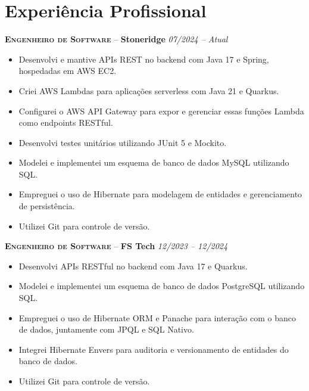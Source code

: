 \documentclass[a4paper,12pt]{article}
\newcommand{\preheadingspacing}{\vspace{6pt}}
\begin{document}
\preheadingspacing

\section{Experiência Profissional}
\vspace{8pt}

\textbf{\textsc{Engenheiro de Software}} -- \textbf{Stoneridge} \hfill \textit{07/2024 -- Atual}

{\small
\begin{itemize}[leftmargin=*,label=\large\textbullet]
    \setlength\itemsep{-0.2em}
    \item Desenvolvi e mantive APIs REST no backend com Java 17 e Spring, hospedadas em AWS EC2.
    \item Criei AWS Lambdas para aplicações serverless com Java 21 e Quarkus.
    \item Configurei o AWS API Gateway para expor e gerenciar essas funções Lambda como endpoints RESTful.
    \item Desenvolvi testes unitários utilizando JUnit 5 e Mockito.
    \item Modelei e implementei um esquema de banco de dados MySQL utilizando SQL.
    \item Empreguei o uso de Hibernate para modelagem de entidades e gerenciamento de persistência.
    \item Utilizei Git para controle de versão.
\end{itemize}
}

\textbf{\textsc{Engenheiro de Software}} -- \textbf{FS Tech} \hfill \textit{12/2023 -- 12/2024}

{\small
\begin{itemize}[leftmargin=*,label=\large\textbullet]
    \setlength\itemsep{-0.2em}
    \item Desenvolvi APIs RESTful no backend com Java 17 e Quarkus.
    \item Modelei e implementei um esquema de banco de dados PostgreSQL utilizando SQL.
    \item Empreguei o uso de Hibernate ORM e Panache para interação com o banco de dados, juntamente com JPQL e SQL Nativo.
    \item Integrei Hibernate Envers para auditoria e versionamento de entidades do banco de dados.
    \item Utilizei Git para controle de versão.
\end{itemize}
}
\end{document}
